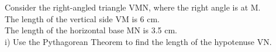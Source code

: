 \documentclass[preview]{standalone}
\begin{document}
\begin{center}
\begin{minipage}{12cm}
\raggedright Consider the right-angled triangle VMN, where the right angle is at M. \\
 The length of the vertical side VM is 6 cm. \\
 The length of the horizontal base MN is 3.5 cm. \\
 i) Use the Pythagorean Theorem to find the length of the hypotenuse VN.
\end{minipage}
\end{center}
\end{document}
